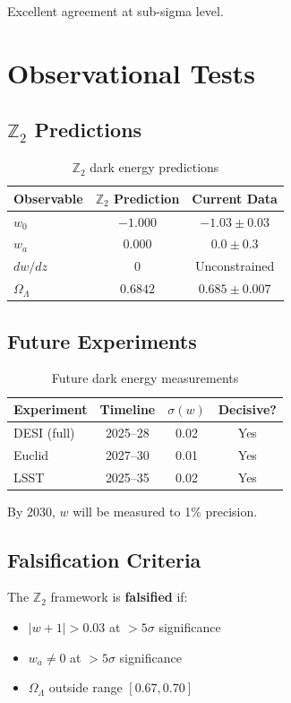 \documentclass[12pt,a4paper]{article}
\begin{document}
Excellent agreement at sub-sigma level.

\section{Observational Tests}

\subsection{$\mathbb{Z}_2$ Predictions}

\begin{table}[h]
\centering
\begin{tabular}{lcc}
\toprule
Observable & $\mathbb{Z}_2$ Prediction & Current Data \\
\midrule
$w_0$ & $-1.000$ & $-1.03 \pm 0.03$ \\
$w_a$ & $0.000$ & $0.0 \pm 0.3$ \\
$dw/dz$ & $0$ & Unconstrained \\
$\Omega_\Lambda$ & $0.6842$ & $0.685 \pm 0.007$ \\
\bottomrule
\end{tabular}
\caption{$\mathbb{Z}_2$ dark energy predictions}
\end{table}

\subsection{Future Experiments}

\begin{table}[h]
\centering
\begin{tabular}{lccc}
\toprule
Experiment & Timeline & $\sigma(w)$ & Decisive? \\
\midrule
DESI (full) & 2025--28 & 0.02 & Yes \\
Euclid & 2027--30 & 0.01 & Yes \\
LSST & 2025--35 & 0.02 & Yes \\
\bottomrule
\end{tabular}
\caption{Future dark energy measurements}
\end{table}

By 2030, $w$ will be measured to 1\% precision.

\subsection{Falsification Criteria}

The $\mathbb{Z}_2$ framework is \textbf{falsified} if:
\begin{itemize}
    \item $|w + 1| > 0.03$ at $>5\sigma$ significance
    \item $w_a \neq 0$ at $>5\sigma$ significance
    \item $\Omega_\Lambda$ outside range $[0.67, 0.70]$
\end{itemize}
\end{document}

